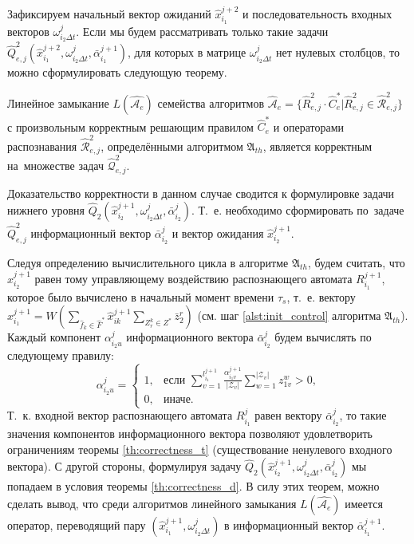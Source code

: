 Зафиксируем начальный вектор ожиданий $\hat x_{i_1}^{j+2}$ и последовательность входных векторов $\omega_{i_2\Delta{t}}^j$. Если мы будем рассматривать только такие задачи $\hat Q_{e,j}^2(\hat x_{i_1}^{j+2},\omega_{i_2\Delta{t}}^j,\bar\alpha_{i_1}^{j+1})$, для которых в матрице $\omega_{i_2\Delta{t}}^j$ нет нулевых столбцов, то можно сформулировать следующую теорему.
		
\begin{Theorem}
	Линейное замыкание $L(\hat{\mathcal A_e})$ семейства алгоритмов $\hat{\mathcal A}_e=\{\hat R_{e,j}^2\cdot\hat C_e^*|\hat R_{e,j}^2\in\hat{\mathcal R}_{e,j}^2\}$ с произвольным корректным решающим правилом $\hat C_e^*$ и операторами распознавания $\hat{\mathcal R}_{e,j}^2$, определёнными алгоритмом $\mathfrak A_{th}$, является корректным на~множестве задач $\hat{\mathcal Q}_{e,j}^2$.
\end{Theorem}

\begin{Proof}
	Доказательство корректности в данном случае сводится к формулировке задачи нижнего уровня $\hat Q_2(\hat x_{i_2}^{j+1},\omega_{i_2\Delta t}^j,\bar\alpha_{i_2}^j)$. Т.~е. необходимо сформировать по~задаче $\hat Q_{e,j}^2$ информационный вектор $\bar\alpha_{i_2}^j$ и вектор ожидания $\hat x_{i_2}^{j+1}$.
	
	Следуя определению вычислительного цикла в алгоритме $\mathfrak A_{th}$, будем считать, что $\hat x_{i_2}^{j+1}$ равен тому управляющему воздействию распознающего автомата $R_{i_1}^{j+1}$, которое было вычислено в начальный момент времени $\tau_s$, т.~е. вектору $\hat x_{i_1}^{j+1}=W(\sum_{\hat f_k\in\hat F^*}\hat x_{ik}^{j+1}\sum_{Z_r^k\in Z^*}\bar z_2^r)$ (см. шаг \ref{alst:init_control} алгоритма $\mathfrak A_{th}$). Каждый компонент $\alpha_{i_2u}^j$ информационного вектора $\bar\alpha_{i_2}^j$ будем вычислять по следующему правилу:
	\begin{equation}
		\alpha_{i_2u}^j=\begin{cases}
			1, & \text{если $\sum\limits_{v=1}^{l_{i_1}^{j+1}}\frac{\alpha_{i_1v}^{j+1}}{|\mathcal{Z}_v|}\sum\limits_{w=1}^{|\mathcal{Z}_v|}z_{1v}^w>0$,}\\
			
			0, & \text{иначе.}
		\end{cases}
	\end{equation}
	Т.~к. входной вектор распознающего автомата $R_{i_1}^j$ равен вектору $\bar\alpha_{i_2}^j$, то такие значения компонентов информационного вектора позволяют удовлетворить ограничениям теоремы \ref{th:correctness_t} (существование ненулевого входного вектора). С другой стороны, формулируя задачу $\hat Q_2(\hat x_{i_2}^{j+1},\omega_{i_2\Delta t}^j,\bar\alpha_{i_2}^j)$ мы попадаем в условия теоремы \ref{th:correctness_d}. В силу этих теорем, можно сделать вывод, что среди алгоритмов линейного замыкания $L(\hat{\mathcal A_e})$ имеется оператор, переводящий пару $(\hat x_{i_1}^{j+1},\omega_{i_2\Delta t}^j)$ в информационный вектор $\bar\alpha_{i_1}^{j+1}$.
\end{Proof}


